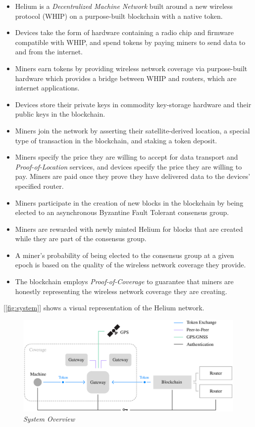 \documentclass[10pt, nonatbib, nocopyrightspace, reprint]{sigplanconf}
\newcommand{\figref}[1]{[\autoref{#1}]}
\begin{document}
\begin{itemize}
    \item Helium is a \emph{Decentralized Machine Network} built around a new wireless protocol (WHIP) on a purpose-built blockchain with a native token.
    \item Devices take the form of hardware containing a radio chip and firmware compatible with WHIP, and spend tokens by paying miners to send data to and from the internet.
    \item Miners earn tokens by providing wireless network coverage via purpose-built hardware which provides a bridge between WHIP and routers, which are internet applications.
    \item Devices store their private keys in commodity key-storage hardware and their public keys in the blockchain.
    \item Miners join the network by asserting their satellite-derived location, a special type of transaction in the blockchain, and staking a token deposit.
    \item Miners specify the price they are willing to accept for data transport and \emph{Proof-of-Location} services, and devices specify the price they are willing to pay. Miners are paid once they prove they have delivered data to the devices' specified router.
    \item Miners participate in the creation of new blocks in the blockchain by being elected to an asynchronous Byzantine Fault Tolerant consensus group.
    \item Miners are rewarded with newly minted Helium for blocks that are created while they are part of the consensus group.
    \item A miner's probability of being elected to the consensus group at a given epoch is based on the quality of the wireless network coverage they provide.
    \item The blockchain employs \emph{Proof-of-Coverage} to guarantee that miners are honestly representing the wireless network coverage they are creating.
\end{itemize}

\figref{fig:system} shows a visual representation of the Helium network.

\begin{figure}[ht]
    \begin{center}
          \includegraphics[width=\textwidth]{schematic.eps}
          \caption{\emph{System Overview}}
          \label{fig:system}
     \end{center}
\end{figure}
\end{document}
